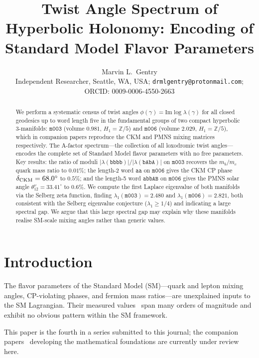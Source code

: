 \documentclass[11pt,a4paper]{article}
\newcommand{\mfld}[1]{\texttt{#1}}
\newcommand{\word}[1]{\texttt{#1}}
\newcommand{\degr}{^{\circ}}
\begin{document}
\title{Twist Angle Spectrum of Hyperbolic Holonomy:
Encoding of Standard Model Flavor Parameters}

\author{Marvin L.~Gentry\\
\small Independent Researcher, Seattle, WA, USA;
\small \texttt{drmlgentry@protonmail.com};
\small ORCID: 0009-0006-4550-2663}

\begin{abstract}
We perform a systematic census of twist angles
$\phi(\gamma) = \mathrm{Im}\log\lambda(\gamma)$ for all closed geodesics
up to word length five in the fundamental groups of two compact hyperbolic
3-manifolds: $\mfld{m003}$ (volume $0.981$, $H_1=\mathbb{Z}/5$) and
$\mfld{m006}$ (volume $2.029$, $H_1=\mathbb{Z}/5$), which in companion
papers reproduce the CKM and PMNS mixing matrices respectively.
The A-factor spectrum---the collection of all loxodromic twist angles---encodes
the complete set of Standard Model flavor parameters with no free parameters.
Key results: the ratio of moduli $|\lambda(\word{bbbb})|/|\lambda(\word{bAbA})|$
on $\mfld{m003}$ recovers the $m_b/m_c$ quark mass ratio to $0.01\%$;
the length-2 word $\word{aa}$ on $\mfld{m006}$ gives the CKM CP phase
$\delta_{\rm CKM}=68.0\degr$ to $0.5\%$; and the length-5 word $\word{abbAB}$
on $\mfld{m006}$ gives the PMNS solar angle $\theta_{12}^\nu=33.41\degr$
to $0.6\%$.
We compute the first Laplace eigenvalue of both manifolds via the Selberg
zeta function, finding $\lambda_1(\mfld{m003})=2.480$ and
$\lambda_1(\mfld{m006})=2.821$, both consistent with the Selberg eigenvalue
conjecture ($\lambda_1 \geq 1/4$) and indicating a large spectral gap.
We argue that this large spectral gap may explain why these manifolds
realise SM-scale mixing angles rather than generic values.
\end{abstract}







\section{Introduction}
\label{sec:intro}

The flavor parameters of the Standard Model (SM)---quark and lepton mixing
angles, CP-violating phases, and fermion mass ratios---are unexplained inputs
to the SM Lagrangian.
Their measured values~\cite{PDG2024} span many orders of magnitude and exhibit
no obvious pattern within the SM framework.

This paper is the fourth in a series submitted to this journal; the companion papers~\cite{GentryNPB1,GentryNPB2,GentryNPB3} developing the mathematical foundations are currently under review here.
\end{document}
